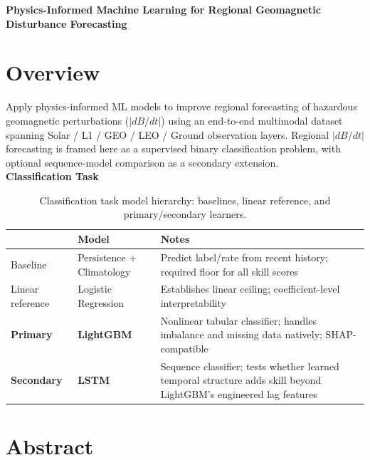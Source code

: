 \documentclass{article}
\begin{document}
\pagestyle{fancy}


\begin{center}
\Large\textbf{Physics-Informed Machine Learning for Regional Geomagnetic Disturbance Forecasting}\\
\end{center}

\section*{Overview}
Apply physics-informed ML models to improve regional forecasting of hazardous geomagnetic perturbations ($|dB/dt|$) using an end-to-end multimodal dataset spanning Solar / L1 / GEO / LEO / Ground observation layers. Regional $|dB/dt|$ forecasting is framed here as a supervised binary classification problem, with optional sequence-model comparison as a secondary extension.\\

\noindent \textbf{Classification Task}

\begin{table}[h]
\centering
\begin{tabular}{|l|l|p{8cm}|}
\hline
& \textbf{Model} & \textbf{Notes} \\ \hline
Baseline & Persistence + Climatology & Predict label/rate from recent history; required floor for all skill scores \\ \hline
Linear reference & Logistic Regression & Establishes linear ceiling; coefficient-level interpretability \\ \hline
\textbf{Primary} & \textbf{LightGBM} & Nonlinear tabular classifier; handles imbalance and missing data natively; SHAP-compatible \\ \hline
\textbf{Secondary} & \textbf{LSTM} & Sequence classifier; tests whether learned temporal structure adds skill beyond LightGBM's engineered lag features \\ \hline
\end{tabular}
\caption{Classification task model hierarchy: baselines, linear reference, and primary/secondary learners.}
\end{table}

\section*{Abstract}
\end{document}
